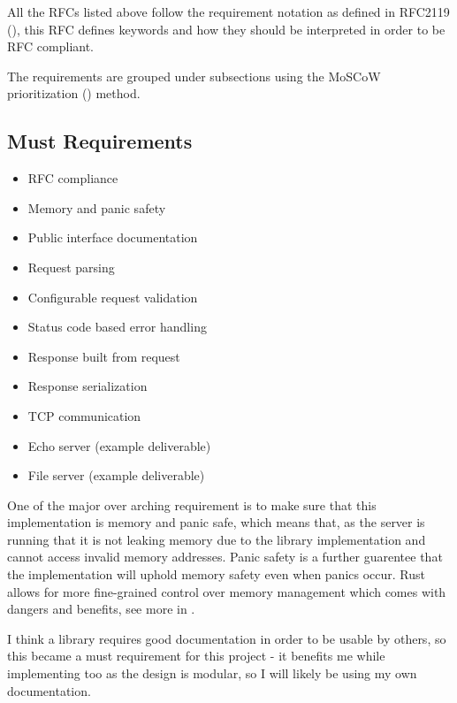 \documentclass[12pt, a4paper]{article}
\begin{document}
All the RFCs listed above follow the requirement notation as defined in RFC2119 (\cite{rfc2119}),
this RFC defines keywords and how they should be interpreted in order to be RFC compliant.

The requirements are grouped under subsections using the MoSCoW prioritization (\cite{moscow}) method.

\subsection{Must Requirements}
\begin{itemize}
    \item\label{mreq:rfc-compliance} RFC compliance
    \item\label{mreq:memory-and-panic-safety} Memory and panic safety
    \item\label{mreq:public-interface-documentation} Public interface documentation
    \item\label{mreq:request-parsing} Request parsing
    \item\label{mreq:configurable-request-validation} Configurable request validation
    \item\label{mreq:status-code-based-errors} Status code based error handling
    \item\label{mreq:response-built-from-request} Response built from request
    \item\label{mreq:response-serialization} Response serialization
    \item\label{mreq:tcp-communication} TCP communication
    \item\label{mreq:example-echo-server} Echo server (example deliverable)
    \item\label{sreq:example-file-server} File server (example deliverable)
\end{itemize}

One of the major over arching requirement is to make sure that this implementation is memory and panic safe, which
means that, as the server is running that it is not leaking memory due to the library implementation
and cannot access invalid memory addresses. Panic safety is a further guarentee that the implementation
will uphold memory safety even when panics occur. Rust allows for more fine-grained control over
memory management which comes with dangers and benefits, see more in
\emph{}.

I think a library requires good documentation in order to be usable by others, so this became a must
requirement for this project - it benefits me while implementing too as the design is modular, so I
will likely be using my own documentation.
\end{document}
